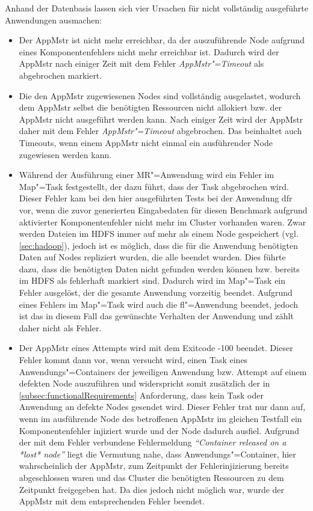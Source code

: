 Anhand der Datenbasis lassen sich vier Ursachen für nicht vollständig ausgeführte Anwendungen ausmachen:

\begin{itemize}
    \item
        Der \ac{AppMstr} ist nicht mehr erreichbar, da der auszuführende Node aufgrund eines Komponentenfehlers nicht mehr erreichbar ist.
        Dadurch wird der \ac{AppMstr} nach einiger Zeit mit dem Fehler \emph{\ac{AppMstr}"=Timeout} als abgebrochen markiert.
    \item
        Die den \ac{AppMstr} zugewiesenen Nodes sind vollständig ausgelastet, wodurch dem \ac{AppMstr} selbst die benötigten Ressourcen nicht allokiert bzw. der \ac{AppMstr} nicht ausgeführt werden kann.
        Nach einiger Zeit wird der \ac{AppMstr} daher mit dem Fehler \emph{\ac{AppMstr}"=Timeout} abgebrochen.
        Das beinhaltet auch Timeouts, wenn einem \ac{AppMstr} nicht einmal ein ausführender Node zugewiesen werden kann.
    \item
        Während der Ausführung einer \ac{MR}"=Anwendung wird ein Fehler im Map"=Task festgestellt, der dazu führt, dass der Task abgebrochen wird.
        Dieser Fehler kam bei den hier ausgeführten Tests bei der Anwendung \acl{dfr} vor, wenn die zuvor generierten Eingabedaten für diesen Benchmark aufgrund aktivierter Komponentenfehler nicht mehr im Cluster vorhanden waren.
        Zwar werden Dateien im \ac{HDFS} immer auf mehr als einem Node gespeichert (vgl. \autoref{sec:hadoop}), jedoch ist es möglich, dass die für die Anwendung benötigten Daten auf Nodes repliziert wurden, die alle beendet wurden.
        Dies führte dazu, dass die benötigten Daten nicht gefunden werden können bzw. bereits im \ac{HDFS} als fehlerhaft markiert sind.
        Dadurch wird im Map"=Task ein Fehler ausgelöst, der die gesamte Anwendung vorzeitig beendet.
        Aufgrund eines Fehlers im Map"=Task wird auch die \acl{fl}"=Anwendung beendet, jedoch ist das in diesem Fall das gewünschte Verhalten der Anwendung und zählt daher nicht als Fehler.
    \item
        Der \ac{AppMstr} eines Attempts wird mit dem Exitcode -100 beendet.
        Dieser Fehler kommt dann vor, wenn versucht wird, einen Task eines Anwendungs"=Containers der jeweiligen Anwendung bzw. Attempt auf einem defekten Node auszuführen und widerspricht somit zusätzlich der in \autoref{subsec:functionalRequirements} Anforderung, dass kein Task oder Anwendung an defekte Nodes gesendet wird.
        Dieser Fehler trat nur dann auf, wenn im ausführende Node des betroffenen \ac{AppMstr} im gleichen Testfall ein Komponentenfehler injiziert wurde und der Node dadurch ausfiel.
        Aufgrund der mit dem Fehler verbundene Fehlermeldung \textit{\enquote{Container released on a *lost* node}} liegt die Vermutung nahe, dass Anwendungs"=Container, hier wahrscheinlich der \ac{AppMstr}, zum Zeitpunkt der Fehlerinjizierung bereits abgeschlossen waren und das Cluster die benötigten Ressourcen zu dem Zeitpunkt freigegeben hat.
        Da dies jedoch nicht möglich war, wurde der \ac{AppMstr} mit dem entsprechenden Fehler beendet.
\end{itemize}

